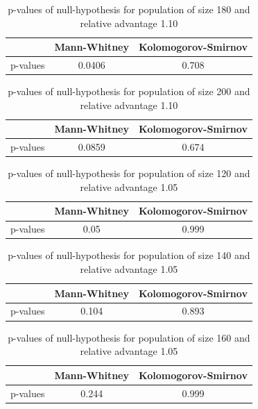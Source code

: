 \documentclass{l4proj}
\begin{document}
\begin{table}[]
    \centering
    \begin{tabular}{|c|c|c|}
    \hline
    & Mann-Whitney & Kolomogorov-Smirnov \\ \hline
    p-values & 0.0406 & 0.708 \\ \hline
    \end{tabular}
    \caption{p-values of null-hypothesis for population of size 180 and relative advantage 1.10}
\end{table}

\begin{table}[]
    \centering
    \begin{tabular}{|c|c|c|}
    \hline
    & Mann-Whitney & Kolomogorov-Smirnov \\ \hline
    p-values & 0.0859 & 0.674 \\ \hline
    \end{tabular}
    \caption{p-values of null-hypothesis for population of size 200 and relative advantage 1.10}
\end{table}

\begin{table}[]
    \centering
    \begin{tabular}{|c|c|c|}
    \hline
    & Mann-Whitney & Kolomogorov-Smirnov \\ \hline
    p-values & 0.05 & 0.999 \\ \hline
    \end{tabular}
    \caption{p-values of null-hypothesis for population of size 120 and relative advantage 1.05}
\end{table}

\begin{table}[]
    \centering
    \begin{tabular}{|c|c|c|}
    \hline
    & Mann-Whitney & Kolomogorov-Smirnov \\ \hline
    p-values & 0.104 & 0.893 \\ \hline
    \end{tabular}
    \caption{p-values of null-hypothesis for population of size 140 and relative advantage 1.05}
\end{table}


\begin{table}[]
    \centering
    \begin{tabular}{|c|c|c|}
    \hline
    & Mann-Whitney & Kolomogorov-Smirnov \\ \hline
    p-values & 0.244 & 0.999  \\ \hline
    \end{tabular}
    \caption{p-values of null-hypothesis for population of size 160 and relative advantage 1.05}
\end{table}
\end{document}
